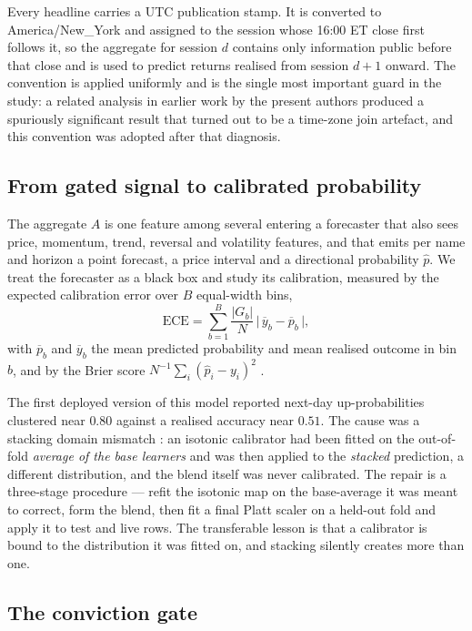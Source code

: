 \documentclass[preprint,12pt,authoryear]{elsarticle}
\theoremstyle{plain}
\theoremstyle{remark}
\begin{document}
Every headline carries a UTC publication stamp. It is converted to
America/New\_York and assigned to the session whose 16:00 ET close first follows
it, so the aggregate for session $d$ contains only information public before
that close and is used to predict returns realised from session $d+1$ onward.
The convention is applied uniformly and is the single most important guard in
the study: a related analysis in earlier work by the present authors produced a
spuriously significant result that turned out to be a time-zone join artefact,
and this convention was adopted after that diagnosis.

\subsection{From gated signal to calibrated probability}\label{sec:calib}

The aggregate $A$ is one feature among several entering a forecaster that also
sees price, momentum, trend, reversal and volatility features, and that emits per
name and horizon a point forecast, a price interval and a directional
probability $\hat p$. We treat the forecaster as a black box and study its
calibration, measured by the expected calibration error over $B$ equal-width
bins,
\begin{equation}\label{eq:ece}
\mathrm{ECE}=\sum_{b=1}^{B}\frac{|G_b|}{N}\,
\bigl|\,\overline{y}_b-\overline{p}_b\,\bigr|,
\end{equation}
with $\overline p_b$ and $\overline y_b$ the mean predicted probability and mean
realised outcome in bin $b$, and by the Brier score
$N^{-1}\sum_i(\hat p_i-y_i)^2$ \citep{brier1950}.

The first deployed version of this model reported next-day up-probabilities
clustered near $0.80$ against a realised accuracy near $0.51$. The cause was a
stacking domain mismatch \citep{wolpert1992}: an isotonic calibrator had been
fitted on the out-of-fold \emph{average of the base learners} and was then
applied to the \emph{stacked} prediction, a different distribution, and the
blend itself was never calibrated. The repair is a three-stage procedure ---
refit the isotonic map on the base-average it was meant to correct, form the
blend, then fit a final Platt scaler \citep{platt1999} on a held-out fold and
apply it to test and live rows. The transferable lesson is that a calibrator is
bound to the distribution it was fitted on, and stacking silently creates more
than one.

\subsection{The conviction gate}\label{sec:gate}
\end{document}
